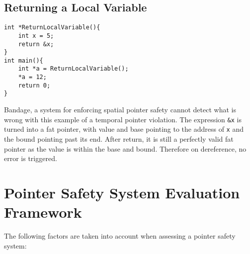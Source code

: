 \subsection{Returning a Local Variable}

\begin{verbatim}
int *ReturnLocalVariable(){
    int x = 5;
    return &x;
}
int main(){
    int *a = ReturnLocalVariable();
    *a = 12;
    return 0;
}
\end{verbatim}

Bandage, a system for enforcing spatial pointer safety cannot detect what is wrong with this example of a temporal pointer violation.
The expression \verb!&x! is turned into a fat pointer, with value and base pointing to the address of \verb!x! and the bound pointing past its end.
After return, it is still a perfectly valid fat pointer as the value is within the base and bound.
Therefore on dereference, no error is triggered.
\section{Pointer Safety System Evaluation Framework}

The following factors are taken into account when assessing a pointer safety system:

